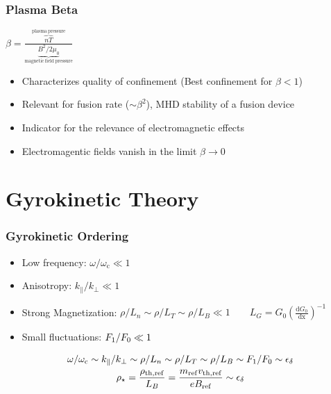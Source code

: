 \documentclass[compress,aspectratio=1610,noflama]{beamer}
\begin{document}
	\begin{frame}
		\frametitle{Plasma Beta}

		\begin{center}
			 $\beta = \frac{\overbrace{nT}^\mathrm{plasma~pressure}}{\underbrace{B^2/2\mu_0}_\mathrm{magnetic~field~pressure}}$
			\bigskip
			\begin{itemize}
				\item <3-> Characterizes quality of confinement (Best confinement for $\beta < 1$)
				\item <3-> Relevant for fusion rate ($\sim \beta^2$), MHD stability of a fusion device
				\item <3-> Indicator for the relevance of electromagnetic effects 
				\item <3-> Electromagentic fields vanish in the limit $\beta \rightarrow 0$
			\end{itemize}
		\end{center}
	\end{frame}

	\section*{Gyrokinetic Theory}

	\begin{frame}
		\frametitle{Gyrokinetic Ordering}

		\begin{center}
			\begin{itemize}
				\item <2-> Low frequency: $\omega/\omega_\mathrm{c} \ll 1$
				\item <2-> Anisotropy: $k_\parallel/k_\perp \ll 1$
				\item <2-> Strong Magnetization: $\rho/L_n \sim \rho/L_T \sim \rho/L_B \ll 1 \qquad L_G = G_0 \left(\frac{\mathrm{d}G_0}{\mathrm{dx}}\right)^{-1}$
				\item <2-> Small fluctuations: $F_1 / F_0 \ll 1$
			\end{itemize}

			\bigskip
			
			\onslide<3-> {
				\begin{gather*}
					\omega /\omega_\mathrm{c} \sim k_\parallel/k_\perp \sim \rho/L_n \sim \rho/L_T \sim \rho/L_B \sim F_1/F_0 \sim \epsilon_\delta \\
					\rho_\star = \frac{\rho_{\mathrm{th},\mathrm{ref}}}{L_B} = \frac{m_\mathrm{ref} v_{\mathrm{th},\mathrm{ref}}}{e B_\mathrm{ref}} \sim \epsilon_\delta
				\end{gather*}
			}
		\end{center}
	\end{frame}
\end{document}
